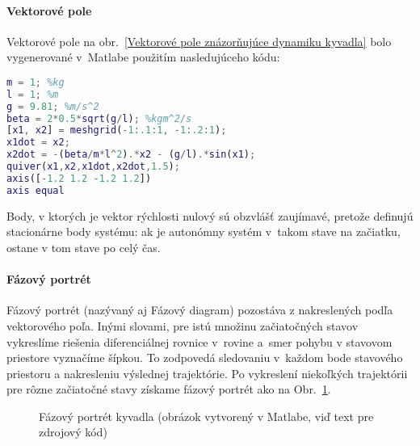 \documentclass[a4paper, 10pt, ]{article}
\begin{document}
%
%
%
%








\paragraph{Vektorové pole}


Vektorové pole na obr.~\ref{Vektorové pole znázorňujúce dynamiku kyvadla} bolo vygenerované v~Matlabe použitím nasledujúceho kódu:
\begin{lstlisting}[language=Matlab, title=Kód pre vygenerovanie obr.~\ref{Vektorové pole znázorňujúce dynamiku kyvadla}]
m = 1; %kg
l = 1; %m
g = 9.81; %m/s^2
beta = 2*0.5*sqrt(g/l); %kgm^2/s
[x1, x2] = meshgrid(-1:.1:1, -1:.2:1);
x1dot = x2;
x2dot = -(beta/m*l^2).*x2 - (g/l).*sin(x1);
quiver(x1,x2,x1dot,x2dot,1.5);
axis([-1.2 1.2 -1.2 1.2])
axis equal
\end{lstlisting}


Body, v ktorých je vektor rýchlosti nulový sú obzvlášť zaujímavé, pretože definujú stacionárne body systému: ak je autonómny systém v~takom stave na začiatku, ostane v tom stave po celý čas.


\paragraph{Fázový portrét}

Fázový portrét (nazývaný aj Fázový diagram) pozostáva z  nakreslených podľa vektorového poľa. Inými slovami, pre istú množinu začiatočných stavov vykreslíme riešenia diferenciálnej rovnice v~rovine a~smer pohybu v stavovom priestore vyznačíme šípkou. To zodpovedá sledovaniu  v~každom bode stavového priestoru a nakresleniu výslednej trajektórie. Po vykreslení niekoľkých trajektórii pre rôzne začiatočné stavy získame fázový portrét ako na Obr.~\ref{Fázový portrét kyvadla}.



\begin{figure}[t]
		\centering
        \vspace{-3mm}
		\vspace{-10mm}
		\caption{Fázový portrét kyvadla (obrázok vytvorený v Matlabe, viď text pre zdrojový kód)}
		\label{Fázový portrét kyvadla}
		\vspace{-3mm}
\end{figure}
\end{document}
